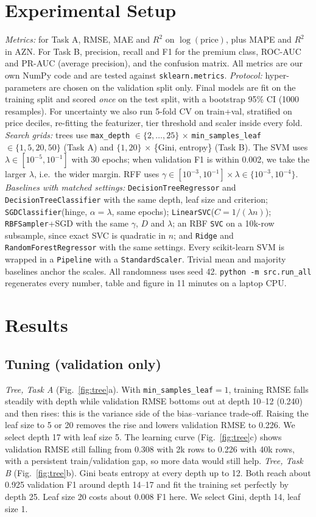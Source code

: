 \documentclass[10pt,twocolumn,a4paper]{article}
\begin{document}
\section{Experimental Setup}
\emph{Metrics:} for Task A, RMSE, MAE and $R^2$ on $\log(\text{price})$,
plus MAPE and $R^2$ in AZN. For Task B, precision, recall and F1 for the
premium class, ROC-AUC and PR-AUC (average precision), and the confusion
matrix. All metrics are our own NumPy code and are tested against
\texttt{sklearn.metrics}.
\emph{Protocol:} hyper-parameters are chosen on the validation split only.
Final models are fit on the training split and scored \emph{once} on the
test split, with a bootstrap 95\% CI (1000 resamples). For uncertainty we
also run 5-fold CV on train+val, stratified on price deciles, re-fitting
the featurizer, tier threshold and scaler inside every fold.
\emph{Search grids:} trees use \texttt{max\_depth} $\in\{2,\dots,25\}$
$\times$ \texttt{min\_samples\_leaf} $\in\{1,5,20,50\}$ (Task A) and
$\{1,20\}$ $\times$ \{Gini, entropy\} (Task B). The SVM uses
$\lambda\in[10^{-5},10^{-1}]$ with 30 epochs; when validation F1 is within
0.002, we take the larger $\lambda$, i.e.\ the wider margin. RFF uses
$\gamma\in[10^{-3},10^{-1}]\times\lambda\in\{10^{-3},10^{-4}\}$.
\emph{Baselines with matched settings:} \texttt{DecisionTreeRegressor} and
\texttt{DecisionTreeClassifier} with the same depth, leaf size and
criterion; \texttt{SGDClassifier}(hinge, $\alpha=\lambda$, same epochs);
\texttt{LinearSVC}($C=1/(\lambda n)$); \texttt{RBFSampler}+SGD with the
same $\gamma$, $D$ and $\lambda$; an RBF \texttt{SVC} on a 10k-row
subsample, since exact SVC is quadratic in $n$; and \texttt{Ridge} and
\texttt{RandomForestRegressor} with the same settings. Every scikit-learn
SVM is wrapped in a \texttt{Pipeline} with a \texttt{StandardScaler}.
Trivial mean and majority baselines anchor the scales. All randomness uses
seed 42. \texttt{python -m src.run\_all} regenerates every number, table
and figure in 11 minutes on a laptop CPU.

\section{Results}
\subsection{Tuning (validation only)}
\emph{Tree, Task A} (Fig.~\ref{fig:tree}a). With
\texttt{min\_samples\_leaf}${}=1$, training RMSE falls steadily with depth
while validation RMSE bottoms out at depth 10--12 (0.240) and then rises:
this is the variance side of the bias--variance trade-off. Raising the leaf
size to 5 or 20 removes the rise and lowers validation RMSE to 0.226. We
select depth 17 with leaf size 5. The learning curve (Fig.~\ref{fig:tree}c)
shows validation RMSE still falling from 0.308 with 2k rows to 0.226 with
40k rows, with a persistent train/validation gap, so more data would still
help. \emph{Tree, Task B} (Fig.~\ref{fig:tree}b). Gini beats entropy at
every depth up to 12. Both reach about 0.925 validation F1 around depth
14--17 and fit the training set perfectly by depth 25. Leaf size 20 costs
about 0.008 F1 here. We select Gini, depth 14, leaf size 1.
\end{document}
